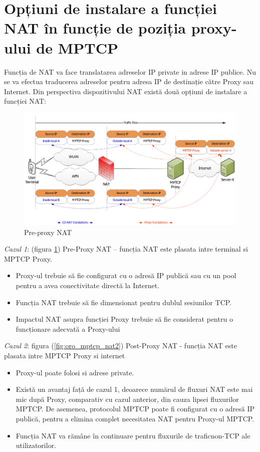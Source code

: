 \section{Opțiuni de instalare a funcției NAT în funcție de poziția proxy-ului de MPTCP }

Funcția de NAT va face translatarea adreselor IP private in adrese IP
publice.  Nu se va efectua traducerea adreselor pentru adresa IP de
destinație către Proxy sau Internet.  Din perspectiva dispozitivului
NAT există două opțiuni de instalare a funcției NAT:
 \\

\begin{figure}[h]
	\centering
	\includegraphics[scale=0.3]{figures/oro/oro_mptcp_nat.png}
	\caption{Pre-proxy NAT}
    	\label{fig:oro_mptcp_nat}
\end{figure}



{\em Cazul 1}: (figura \ref{fig:oro_mptcp_nat}) Pre-Proxy NAT – funcția NAT este plasata intre terminal si MPTCP Proxy.
\begin{itemize}
 \item	Proxy-ul trebuie să fie configurat cu o adresă IP publică sau cu un pool pentru a avea conectivitate directă la Internet.
\item Funcția NAT trebuie să fie dimensionat pentru dublul sesiunilor TCP.
\item Impactul NAT asupra funcției Proxy trebuie să fie considerat pentru o funcționare adecvată a Proxy-ului
\end{itemize}
 
  
{\em Cazul 2}: figura (\ref{fig:oro_mptcp_nat2}) Post-Proxy NAT - funcția NAT este plasata intre MPTCP Proxy si internet
\begin{itemize}
 \item	Proxy-ul poate folosi si adrese private.
\item	Există un avantaj față de cazul 1, deoarece numărul de fluxuri NAT este mai mic după Proxy, comparativ cu cazul anterior, din cauza lipsei fluxurilor MPTCP. De asemenea, protocolul MPTCP poate fi configurat cu o adresă IP publică, pentru a elimina complet necesitatea NAT pentru Proxy-ul MPTCP.
\item	Funcția NAT va rămâne în continuare pentru fluxurile de traficnon-TCP ale utilizatorilor.
 \end{itemize}
 
